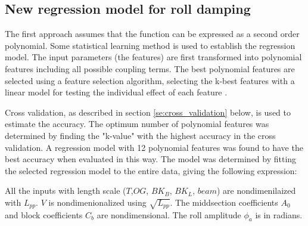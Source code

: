 \subsection{New regression model for roll damping}
The first approach assumes that the function can be expressed as a second order polynomial. Some statistical learning method is used to establish the regression model. The input parameters (the features) are first transformed into polynomial features including all possible coupling terms. The best polynomial features are selected using a feature selection algorithm, selecting the k-best features \parencite[]{noauthor_sklearnfeature_selectionselectkbest_nodate} with a linear model for testing the individual effect of each feature \parencite[]{noauthor_sklearnfeature_selectionf_regression_nodate}. 

Cross validation, as described in section \ref{se:cross_validation} below, is used to estimate the accuracy. The optimum number of polynomial features was determined by finding the "k-value" with the highest accuracy in the cross validation. A regression model with 12 polynomial features was found to have the best accuracy when evaluated in this way. The model was determined by fitting the selected regression model to the entire data, giving the following expression:


All the inputs with length scale ($T$,$OG$, $BK_{B}$, $BK_{L}$, $beam$) are nondimenilaized with $L_{pp}$. $V$ is nondimenionalized using $\sqrt{L_{pp}}$. The middsection coefficients $A_0$ and block coefficients $C_b$ are nondimensional. The roll amplitude $\phi_a$ is in radians.


